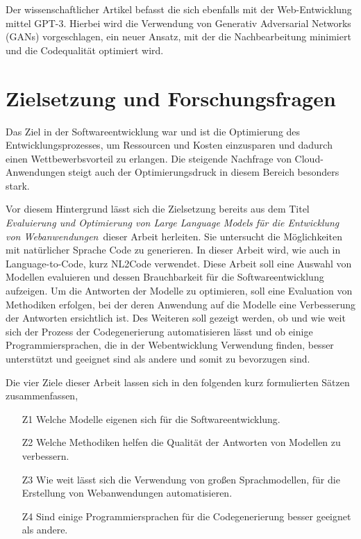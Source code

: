 Der wissenschaftlicher Artikel \cite{nataraj-2024} befasst die sich ebenfalls mit der Web-Entwicklung mittel GPT-3. Hierbei wird die Verwendung von Generativ Adversarial Networks (GANs) vorgeschlagen, ein neuer Ansatz, mit der die Nachbearbeitung minimiert und die Codequalität optimiert wird.

\section{Zielsetzung und Forschungsfragen}
Das Ziel in der Softwareentwicklung war und ist die Optimierung des Entwicklungsprozesses, um Ressourcen und Kosten einzusparen und dadurch einen Wettbewerbsvorteil zu erlangen. Die steigende Nachfrage von Cloud-Anwendungen steigt auch der Optimierungsdruck in diesem Bereich besonders stark.\vspace{0.2cm}

Vor diesem Hintergrund lässt sich die Zielsetzung bereits aus dem Titel \glqq \textit{Evaluierung und Optimierung von Large Language Models für die Entwicklung von Webanwendungen}\grqq \ dieser Arbeit herleiten. Sie untersucht die Möglichkeiten mit natürlicher Sprache Code zu generieren. In dieser Arbeit wird, wie auch in \cite[vgl. Seite 2]{jiang-2024} Language-to-Code, kurz NL2Code verwendet. Diese Arbeit soll eine Auswahl von Modellen evaluieren und dessen Brauchbarkeit für die Softwareentwicklung aufzeigen. Um die Antworten der Modelle zu optimieren, soll eine Evaluation von Methodiken erfolgen, bei der deren Anwendung auf die Modelle eine Verbesserung der Antworten ersichtlich ist. Des Weiteren soll gezeigt werden, ob und wie weit sich der Prozess der Codegenerierung automatisieren lässt und ob einige Programmiersprachen, die in der Webentwicklung Verwendung finden, besser unterstützt und geeignet sind als andere und somit zu bevorzugen sind.\vspace{0.2cm}

Die vier Ziele dieser Arbeit lassen sich in den folgenden kurz formulierten Sätzen zusammenfassen,

\begin{itemize}
	\item[Z1] Welche Modelle eigenen sich für die Softwareentwicklung.
	\item[Z2] Welche Methodiken helfen die Qualität der Antworten von Modellen zu verbessern.
	\item[Z3] Wie weit lässt sich die Verwendung von großen Sprachmodellen, für die Erstellung von Webanwendungen automatisieren.
	\item[Z4] Sind einige Programmiersprachen für die Codegenerierung besser geeignet als andere.
\end{itemize}


